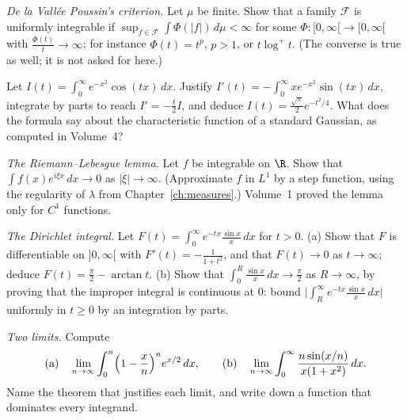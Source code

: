\begin{exercise}[$\star\star$]\label{ex:vallee}
\emph{De la Vall\'ee Poussin's criterion.} Let \(\mu\) be finite. Show that a family \(\mathcal F\) is uniformly integrable if \(\sup_{f\in\mathcal F}\int\Phi(|f|)\,d\mu<\infty\) for some \(\Phi:[0,\infty[\to[0,\infty[\) with
\(\frac{\Phi(t)}t\to\infty\); for instance \(\Phi(t)=t^p\), \(p>1\), or \(t\log^+t\). (The converse is true as well; it is not asked for here.)
\end{exercise}

\begin{exercise}[$\star\star$]\label{ex:gausscos}
Let \(I(t)=\int_0^\infty e^{-x^2}\cos(tx)\,dx\). Justify \(I'(t)=-\int_0^\infty xe^{-x^2}\sin(tx)\,dx\), integrate by parts to reach \(I'=-\frac t2I\), and deduce \(I(t)=\frac{\sqrt\pi}2e^{-t^2/4}\). What does the formula say about
the characteristic function of a standard Gaussian, as computed in Volume~4?
\end{exercise}

\begin{exercise}[$\star\star$]\label{ex:rlemma}
\emph{The Riemann--Lebesgue lemma.} Let \(f\) be integrable on \(\R\). Show that \(\int f(x)e^{i\xi x}\,dx\to0\) as \(|\xi|\to\infty\). (Approximate \(f\) in \(L^1\) by a step function, using the regularity of
\(\lambda\) from Chapter~\ref{ch:measures}.) Volume~1 proved the lemma only for \(C^1\) functions.
\end{exercise}

\begin{exercise}[$\star\star\star$]\label{ex:dirichlet}
\emph{The Dirichlet integral.} Let \(F(t)=\int_0^\infty e^{-tx}\frac{\sin x}x\,dx\) for \(t>0\). (a) Show that \(F\) is differentiable on \(]0,\infty[\) with \(F'(t)=-\frac1{1+t^2}\), and that \(F(t)\to0\) as \(t\to\infty\); deduce
\(F(t)=\frac\pi2-\arctan t\). (b) Show that \(\int_0^R\frac{\sin x}x\,dx\to\frac\pi2\) as \(R\to\infty\), by proving that the improper integral is continuous at \(0\): bound
\(\bigl|\int_R^\infty e^{-tx}\frac{\sin x}x\,dx\bigr|\) uniformly in \(t\ge0\) by an integration by parts.
\end{exercise}

\begin{exercise}[$\star$]\label{ex:limits}
\emph{Two limits.} Compute
\[\text{(a)}\quad\lim_{n\to\infty}\int_0^n\Bigl(1-\frac xn\Bigr)^ne^{x/2}\,dx,\qquad\text{(b)}\quad\lim_{n\to\infty}\int_0^\infty\frac{n\sin(x/n)}{x(1+x^2)}\,dx.\]
Name the theorem that justifies each limit, and write down a function that dominates every integrand.
\end{exercise}

